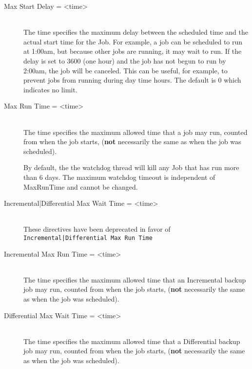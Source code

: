 \begin{description}
\item [Max Start Delay = {\textless}time{\textgreater}] \hfill \\
The time specifies the maximum delay between the scheduled time and the
actual start time for the Job.  For example, a job can be scheduled to
run at 1:00am, but because other jobs are running, it may wait to run.
If the delay is set to 3600 (one hour) and the job has not begun to run
by 2:00am, the job will be canceled.  This can be useful, for example,
to prevent jobs from running during day time hours.  The default is 0
which indicates no limit.

\item [Max Run Time = {\textless}time{\textgreater}] \hfill \\
The time specifies the maximum allowed time that a job may run, counted
from when the job starts, ({\bf not} necessarily the same as when the
job was scheduled).

By default, the the watchdog thread will kill any Job that has run more
than 6 days.  The maximum watchdog timeout is independent of MaxRunTime
and cannot be changed.

\item [Incremental|Differential Max Wait Time = {\textless}time{\textgreater}] \hfill \\
These directives have been deprecated in favor of
\texttt{Incremental|Differential Max Run Time}

\item [Incremental Max Run Time = {\textless}time{\textgreater}] \hfill \\
The time specifies the maximum allowed time that an Incremental backup job may
run, counted from when the job starts, ({\bf not} necessarily the same as when
the job was scheduled).

\item [Differential Max Wait Time = {\textless}time{\textgreater}] \hfill \\
The time specifies the maximum allowed time that a Differential backup job may
run, counted from when the job starts, ({\bf not} necessarily the same as when
the job was scheduled).


\end{description}
